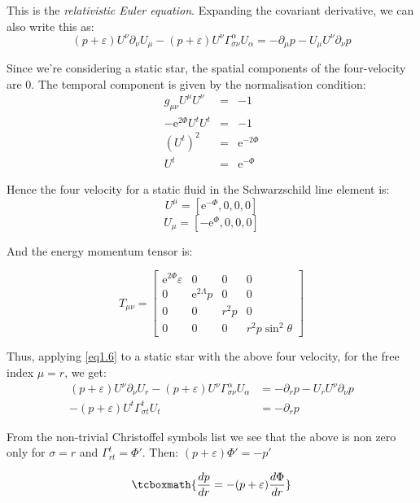 \documentclass[12pt, letterpaper]{report}
\begin{document}
This is the \emph{relativistic Euler equation}. Expanding the covariant derivative, we can also write this as: 
\begin{equation}
    (p+\varepsilon)U^\nu\partial_\nu U_\mu -(p+\varepsilon)U^\nu \Gamma^{\alpha}_{\sigma\nu}U_\alpha = -\partial_\mu p- U_\mu U^\nu \partial_\nu p \label{eq1.6}
\end{equation}

Since we're considering a static star, the spatial components of the four-velocity are 0. The temporal component is given by the normalisation condition: 
\begin{eqnarray*}
    g_{\mu\nu} U^\mu U^\nu &=& -1 \\
    -\mathrm{e}^{2\Phi}U^t U^t &=& -1\\ 
    (U^t)^2 &=& \mathrm{e}^{-2\Phi}\\
    U^t &=& \mathrm{e}^{-\Phi}
\end{eqnarray*}

Hence the four velocity for a static fluid in the Schwarzschild line element is: $$U^\mu= [\mathrm{e}^{-\Phi}, 0, 0, 0]$$ $$U_\mu= [-\mathrm{e}^{\Phi}, 0, 0, 0]$$

And the energy momentum tensor is: 

\[
T_{\mu\nu}= \begin{bmatrix}
    \mathrm{e}^{2\Phi}\varepsilon & 0 & 0 & 0 \\
    0 & \mathrm{e}^{2\Lambda}p & 0 & 0 \\
    0 & 0 & r^2p & 0 \\
    0 & 0 & 0 & r^2p\sin^2\theta
\end{bmatrix}
\]

Thus, applying \cref{eq1.6} to a static star with the above four velocity, for the free index $\mu=r$, we get: 
\begin{align*}
    (p+\varepsilon)U^\nu\partial_\nu U_r -(p+\varepsilon)U^\nu \Gamma^{\alpha}_{\sigma\nu}U_\alpha &= -\partial_r p- U_r U^\nu \partial_\nu p\\
    -(p+\varepsilon)U^t \Gamma^{t}_{\sigma t}U_t &= -\partial_r p
\end{align*}

From the non-trivial Christoffel symbols list we see that the above is non zero only for $\sigma= r$ and $\Gamma^{t}_{r t}= \Phi'$. Then: $(p+\varepsilon)\Phi' = -p'$

\begin{equation}
    \tcboxmath{\frac{dp}{dr}= -(p+\varepsilon)\frac{d\Phi}{dr}} \label{eq1.7}
\end{equation}
\end{document}
